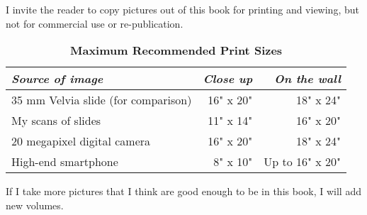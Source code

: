 I invite the reader to copy pictures out of this book for printing and viewing, but not for commercial use or re-publication. 

\begin{table}[h]
\centering
\captionsetup{labelformat=empty}
\caption{\textbf{Maximum Recommended Print Sizes}}
\begin{tabular}{lrr}
\hline
\emph{Source of image}                                  & \emph{Close up} & \emph{On the wall} \\
\hline
35 mm Velvia slide (for comparison) & 16" x 20" & 18" x 24" \\
My scans of slides                            & 11" x 14"  & 16" x 20"  \\
20 megapixel digital camera             & 16" x 20"  & 18" x 24"  \\
High-end smartphone                      & 8" x 10"   & Up to 16" x 20"  \\
\hline
\end{tabular}
\end{table}

If I take more pictures that I think are good enough to be in this book, I will add new volumes.
